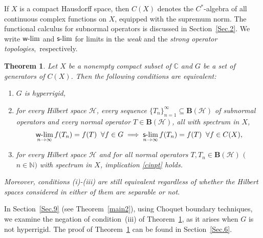 \documentclass[reqno]{amsproc}
\numberwithin{equation}{section}
\newtheorem{theorem}{Theorem}[section]
\theoremstyle{remark}
\newcommand*{\hh}{\mathcal{H}}
\newcommand*{\natu}{\mathbb{N}}
\newcommand*{\comp}{\mathbb{C}}
\newcommand*{\bou}{\boldsymbol{B}}
\newcommand*{\cbb}{\comp}
\theoremstyle{definition}
\def\sslim{\qopname\relax m{{\sf{s}\textrm-}lim}}
\def\wwlim{\qopname\relax m{{\sf{w}\textrm-}lim}}
\begin{document}
If $X$ is a compact Hausdorff space, then $C(X)$
denotes the $C^*$-algebra of all continuous complex
functions on $X$, equipped with the supremum norm. The
functional calculus for subnormal operators is
discussed in Section~\ref{Sec.2}. We write $\wwlim$
and $\sslim$ for limits in the {\em weak} and the {\em
strong operator topologies},~respectively.
   \begin{theorem} \label{jydgunr}
Let $X$ be a nonempty compact subset of $\cbb$ and $G$
be a set of generators of $C(X)$. Then the following
conditions are equivalent{\em :}
   \begin{enumerate}
   \item[(i)] $G$ is hyperrigid,
   \item[(ii)]
for every Hilbert space $\hh$, every sequence
$\{T_n\}_{n=1}^{\infty} \subseteq \bou(\hh)$ of
subnormal operators and every normal operator $T\in
\bou(\hh)$, all with spectrum in $X$,
   \begin{align} \label{cinpt}
\wwlim_{n\to \infty} f(T_n) = f(T) \;\; \forall f\in G
\implies \sslim_{n\to \infty} f(T_n) = f(T) \;\;
\forall f\in C(X),
   \end{align}
   \item[(iii)]
for every Hilbert space $\hh$ and for all normal
operators $T, T_n \in \bou(\hh)$ $($$n\in \natu$$)$
with spectrum in $X$, implication \eqref{cinpt} holds.
   \end{enumerate}
Moreover, conditions {\em (i)-(iii)} are still
equivalent regardless of whether the Hilbert spaces
considered in either of them are separable or not.
   \end{theorem}
In Section~\ref{Sec.9} (see Theorem~\ref{main2}),
using Choquet boundary techniques, we examine the
negation of condition~(iii) of Theorem~\ref{jydgunr},
as it arises when $G$ is not hyperrigid. The proof of
Theorem~\ref{jydgunr} can be found in
Section~\ref{Sec.6}.
\end{document}
